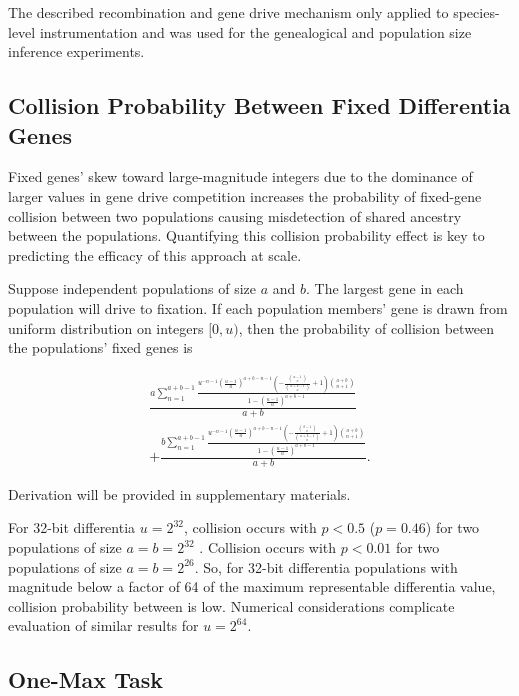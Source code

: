 The described recombination and gene drive mechanism only applied to species-level instrumentation and was used for the genealogical and population size inference experiments.

\subsection{Collision Probability Between Fixed Differentia Genes}
\label{sec:collision-probability}

Fixed genes' skew toward large-magnitude integers due to the dominance of larger values in gene drive competition increases the probability of fixed-gene collision between two populations causing misdetection of shared ancestry between the populations.
Quantifying this collision probability effect is key to predicting the efficacy of this approach at scale.

Suppose independent populations of size $a$ and $b$.
The largest gene in each population will drive to fixation.
If each population members' gene is drawn from uniform distribution on integers $[0, u)$, then the probability of collision between the populations' fixed genes is

\begin{align*}
\frac{a \sum_{n=1}^{a + b - 1} \frac{u^{- n - 1} \left(\frac{u - 1}{u}\right)^{a + b - n - 1} \left(- \frac{{\binom{a - 1}{n}}}{{\binom{a + b - 1}{n}}} + 1\right) {\binom{a + b}{n + 1}}}{1 - \left(\frac{u - 1}{u}\right)^{a + b - 1}}}{a + b} \\
+ \frac{b \sum_{n=1}^{a + b - 1} \frac{u^{- n - 1} \left(\frac{u - 1}{u}\right)^{a + b - n - 1} \left(- \frac{{\binom{b - 1}{n}}}{{\binom{a + b - 1}{n}}} + 1\right) {\binom{a + b}{n + 1}}}{1 - \left(\frac{u - 1}{u}\right)^{a + b - 1}}}{a + b}.
\end{align*}

Derivation will be provided in supplementary materials.

For 32-bit differentia $u = 2^{32}$, collision occurs with $p < 0.5$ ($p = 0.46$) for two populations of size $a = b = 2^{32}$ .
Collision occurs with $p < 0.01$ for two populations of size $a = b = 2^{26}$.
So, for 32-bit differentia populations with magnitude below a factor of 64 of the maximum representable differentia value, collision probability between is low.
Numerical considerations complicate evaluation of similar results for $u = 2^{64}$.

\subsection{One-Max Task}
\label{sec:one-max}

